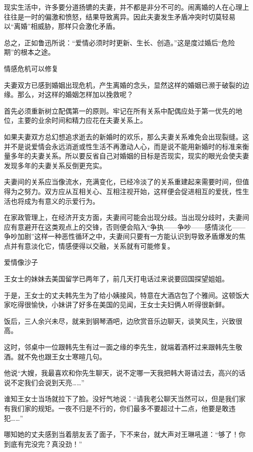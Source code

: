 \documentclass[12pt,UTF8,openany]{ctexbook}
\begin{document}
现实生活中，许多要分道扬镳的夫妻，并不都是非分不可的。闹离婚的人在心理上往往是一时的偏激和愤怒，结果导致离异。因此夫妻发生矛盾冲突时切莫轻易以“离婚”相威胁，那样只会激化矛盾。

总之，正如鲁迅所说：“爱情必须时时更新、生长、创造。”这是度过婚后“危险期”的根本之途。





情感危机可以修复


夫妻双方已感到婚姻出现危机，产生离婚的念头，显然这样的婚姻已濒于破裂的边缘。那么，对这样的婚姻怎样加以挽救呢？

首先必须重新树立配偶第一的原则。牢记在所有关系中配偶应处于第一优先的地位，主要的业余时间和精力应花在夫妻关系上。

如果夫妻双方总幻想追求逝去的新婚时的欢乐，那么夫妻关系难免会出现裂缝。这并不是说爱情会永远消逝或性生活不再激动人心，而是说不能用新婚时的标准来衡量多年的夫妻关系。所以要反省自己对婚姻的目标是否现实，现实的眼光会使夫妻发现多年的夫妻关系反倒更充实。

夫妻间的关系应当像流水，充满变化，已经冷淡了的关系重建起来需要时间，但值得为之努力。双方应从互相关心、互相注视开始，这样便会促进相互的爱抚，性生活也将成为有意义的示爱行为。

在家政管理上，在经济开支方面，夫妻间可能会出现分歧。当出现分歧时，夫妻间应有意避开在这类观点上的交锋，否则便会陷入“争执——争吵——感情淡化——争吵加剧”这样一种恶性循环之中，夫妻间只要有一方能认识到导致矛盾爆发的焦点并有意淡化它，情感便得以交融，关系就有可能修复。





爱情像沙子


王女士的妹妹去美国留学已两年了，前几天打电话过来说要回国探望姐姐。

于是，王女士的丈夫韩先生为了给小姨接风，特意在大酒店包了个雅间。这顿饭大家吃得很愉快，小妹讲了好多在美国的见闻，王女士夫妇俩人听得很新鲜。

饭后，三人余兴未尽，就来到钢琴酒吧，边欣赏音乐边聊天，谈笑风生，兴致很高。

这时，邻桌中一位跟韩先生有过一面之缘的李先生，就端着酒杯过来跟韩先生敬酒。就不免也跟王女士寒暄几句。

他说“大嫂，我最喜欢和你先生聊天，说不定哪一天我把韩大哥请过去，高兴的话说不定我们会说到天亮……”

谁知王女士当场就拉下了脸。没好气地说：“请我老公聊天当然可以，但是我们家有我们家的规矩。一夜不归是不行的，你们最多不要超过十二点，他要是敢违犯……”

哪知她的丈夫感到当着朋友丢了面子，下不来台，就大声对王琳吼道：“够了！你到底有完没完？真没劲！”
\end{document}
